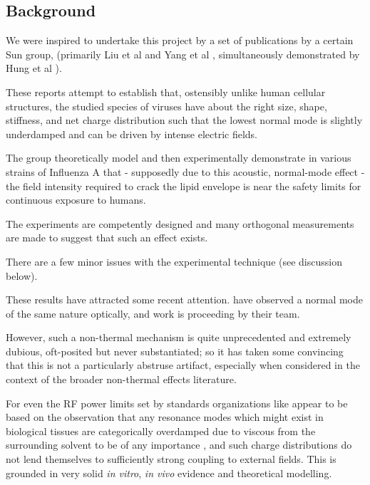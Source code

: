 \documentclass[paper.tex]{subfiles}
\begin{document}
\begin{multicols}{1}

\section{Background}



We were inspired to undertake this project by a set of publications by a certain Sun group, (primarily Liu et al \cite{Microwave2009} and Yang et al \cite{Efficient2015}, simultaneously demonstrated by Hung et al \cite{focusing2014}).

These reports attempt to establish that, ostensibly unlike human cellular structures, the studied species of viruses have about the right size, shape, stiffness, and net charge distribution such that the lowest normal mode is slightly underdamped and can be driven by intense electric fields. 

The group theoretically model and then experimentally demonstrate in various strains of Influenza A that - supposedly due to this acoustic, normal-mode effect - the field intensity required to crack the lipid envelope is near the safety limits for continuous exposure to humans.

The experiments are competently designed and many orthogonal measurements are made to suggest that such an effect exists.

There are a few minor issues with the experimental technique (see discussion below).

These results have attracted some recent attention. \cite{Optical2020} have observed a normal mode of the same nature optically, and work is proceeding by their team.

However, such a non-thermal mechanism is quite unprecedented and extremely dubious, oft-posited but never substantiated; so it has taken some convincing that this is not a particularly abstruse artifact, especially when considered in the context of the broader non-thermal effects literature.

For even the RF power limits set by standards organizations like \cite{ICNIRP2020} \cite{IEEE2006} appear to be based on the observation that any resonance modes which might exist in biological tissues are categorically overdamped due to viscous from the surrounding solvent to be of any importance \cite{Vibrational2002}, and such charge distributions do not lend themselves to sufficiently strong coupling to external fields. This is grounded in very solid {\it in vitro}, {\it in vivo} evidence and theoretical modelling. 


\end{multicols}
\end{document}
